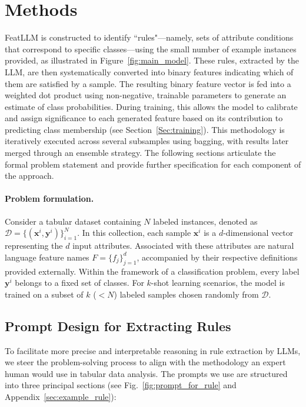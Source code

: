 \section{Methods}
\textsf{FeatLLM} is constructed to identify ``rules"—namely, sets of attribute conditions that correspond to specific classes—using the small number of example instances provided, as illustrated in Figure~\ref{fig:main_model}. These rules, extracted by the LLM, are then systematically converted into binary features indicating which of them are satisfied by a sample. The resulting binary feature vector is fed into a weighted dot product using non-negative, trainable parameters to generate an estimate of class probabilities. During training, this allows the model to calibrate and assign significance to each generated feature based on its contribution to predicting class membership (see Section~\ref{Sec:training}). This methodology is iteratively executed across several subsamples using bagging, with results later merged through an ensemble strategy. The following sections articulate the formal problem statement and provide further specification for each component of the approach.

\vspace*{-0.12in}
\paragraph{Problem formulation.} Consider a tabular dataset containing $N$ labeled instances, denoted as $\mathcal{D} = \{(\mathbf{x}^i, \mathbf{y}^i)\}_{i=1}^{N}$. In this collection, each sample $\mathbf{x}^i$ is a $d$-dimensional vector representing the $d$ input attributes. Associated with these attributes are natural language feature names $F = \{f_j\}_{j=1}^{d}$, accompanied by their respective definitions provided externally. Within the framework of a classification problem, every label $\mathbf{y}^i$ belongs to a fixed set of classes. For $k$-shot learning scenarios, the model is trained on a subset of $k$ ($<N$) labeled samples chosen randomly from $\mathcal{D}$.

\subsection{Prompt Design for Extracting Rules}
\label{Sec:prompt_design}
To facilitate more precise and interpretable reasoning in rule extraction by LLMs, we steer the problem-solving process to align with the methodology an expert human would use in tabular data analysis. The prompts we use are structured into three principal sections (see Fig.~\ref{fig:prompt_for_rule} and Appendix~\ref{sec:example_rule}):

